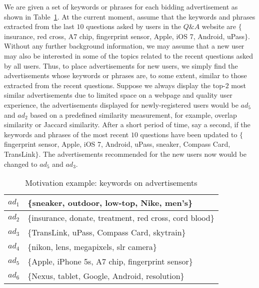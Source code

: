 \begin{example}\label{motivation}
We are given a set of keywords or phrases for each bidding advertisement as shown in Table~\ref{adskeyword}. At the current moment, assume that the keywords and phrases extracted from the last $10$ questions asked by users in the $Q\&A$ website are $\{$insurance, red cross, A7 chip, fingerprint sensor, Apple, iOS 7, Android, uPass$\}$. Without any further background information, we may assume that a new user may also be interested in some of the topics related to the recent questions asked by all users. Thus, to place advertisements for new users, we simply find the advertisements whose keywords or phrases are, to some extent, similar to those extracted from the recent questions. Suppose we always display the top-$2$ most similar advertisements due to limited space on a webpage and quality user experience, the advertisements displayed for newly-registered users would be $ad_5$ and $ad_2$ based on a predefined similarity measurement, for example, overlap similarity or Jaccard similarity. After a short period of time, say a second, if the keywords and phrases of the most recent $10$ questions have been updated to $\{$fingerprint sensor, Apple, iOS 7, Android, uPass, sneaker, Compass Card, TransLink$\}$. The advertisements recommended for the new users now would be changed to $ad_5$ and $ad_3$.             
\end{example}
 
\begin{table}[t]
     \centering
     \caption{Motivation example: keywords on advertisements}
     {
\begin{tabular}{|c||p{9cm}|} \hline
      $ad_1$& \{sneaker, outdoor, low-top, Nike, men's\}  \\ \hline
      $ad_2$& \{insurance, donate, treatment, red cross, cord blood\}  \\ \hline
      $ad_3$& \{TransLink, uPass, Compass Card, skytrain\}  \\ \hline
      $ad_4$& \{nikon, lens, megapixels, slr camera\} \\ \hline
      $ad_5$& \{Apple, iPhone 5s, A7 chip, fingerprint sensor\} \\ \hline
      $ad_6$& \{Nexus, tablet, Google, Android, resolution\} \\ \hline
\end{tabular}
    }
    \label{adskeyword}
\end{table}

